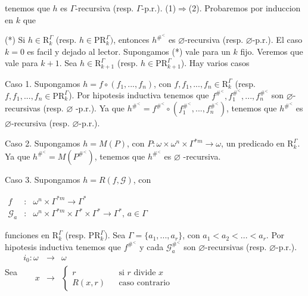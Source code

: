 tenemos que \(h\) es \(\Gamma \)-recursiva (resp. \(\Gamma \)-p.r.).
(1)\(\Rightarrow \)(2). Probaremos por induccion en \(k\) que

(*) Si \(h\in \mathrm{R}_{k}^{\Gamma }\) (resp. \(h\in \mathrm{PR} _{k}^{\Gamma })\), entonces \(h^{\#^{< }}\) es \(\varnothing \)-recursiva (resp. \( \varnothing \)-p.r.).
El caso \(k=0\) es facil y dejado al lector. Supongamos (*) vale para un \(k\) fijo. Veremos que vale para \(k+1\). Sea \(h\in \mathrm{R} _{k+1}^{\Gamma }\) (resp. \(h\in \mathrm{PR}_{k+1}^{\Gamma }\)). Hay varios casos

Caso 1. Supongamos \(h=f\circ (f_{1},...,f_{n})\), con \(f,f_{1},...,f_{n}\in \mathrm{R}_{k}^{\Gamma }\) (resp. \(f,f_{1},...,f_{n}\in \mathrm{PR} _{k}^{\Gamma }\)). Por hipotesis inductiva tenemos que \(f^{\#^{< }},f_{1}^{ \#^{< }},...,f_{n}^{\#^{< }}\) son \(\varnothing \)-recursivas (resp. \(\varnothing \) -p.r.). Ya que \(h^{\#^{< }}=f^{\#^{< }}\circ \left( f_{1}^{\#^{< }},...,f_{n}^{\#^{< }}\right) \), tenemos que \(h^{\#^{< }}\) es \( \varnothing \)-recursiva (resp. \(\varnothing \)-p.r.).

Caso 2. Supongamos \(h=M(P)\), con \(P:\omega \times \omega ^{n}\times \Gamma ^{\ast m}\rightarrow \omega \), un predicado en \(\mathrm{R}_{k}^{\Gamma }\). Ya que \(h^{\#^{< }}=M(P^{\#^{< }})\), tenemos que \(h^{\#^{< }}\) es \(\varnothing \) -recursiva.

Caso 3. Supongamos \(h=R(f,\mathcal{G})\), con

\(\displaystyle \begin{array}{rcl} f & :& \omega ^{n}\times \Gamma ^{\ast m}\rightarrow \Gamma ^{\ast } \\ \mathcal{G}_{a} & :& \omega ^{n}\times \Gamma ^{\ast m}\times \Gamma ^{\ast }\times \Gamma ^{\ast }\rightarrow \Gamma ^{\ast }\text{, }a\in \Gamma \end{array} \)

funciones en \(\mathrm{R}_{k}^{\Gamma }\) (resp. \(\mathrm{PR}_{k}^{\Gamma }\)). Sea \(\Gamma =\{a_{1},...,a_{r}\}\), con \(a_{1}< a_{2}< ...< a_{r}\). Por hipotesis inductiva tenemos que \(f^{\#^{< }}\) y cada \(\mathcal{G} _{a}^{\#^{< }} \) son \(\varnothing \)-recursivas (resp. \(\varnothing \)-p.r.). Sea
\(\displaystyle \begin{array}{lll} i_{0}:\omega & \rightarrow & \omega \\ \;\;\;\;\;x & \rightarrow & \left\{ \begin{array}{lll} r & & \text{si }r\text{ divide }x \\ R(x,r) & & \text{caso contrario} \end{array} \right. \end{array} \)

